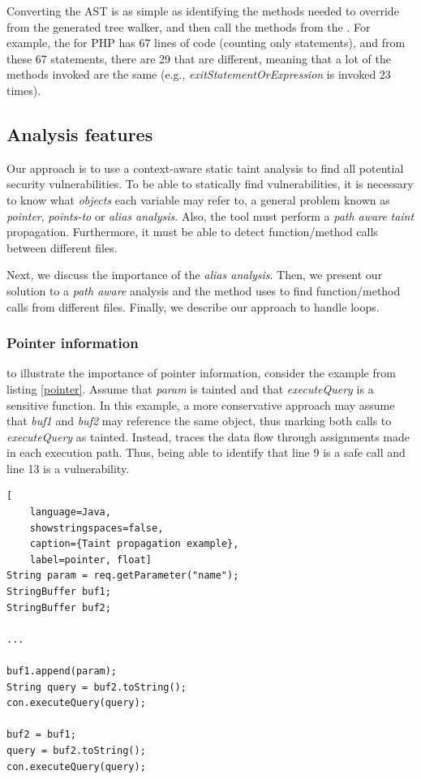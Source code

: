 Converting the AST is as simple as identifying the methods needed to override from the generated tree walker, and then call the methods from the \astbuilder{}.
For example, the \converter{} for PHP has 67 lines of code (counting only statements), and from these 67 statements, there are 29 that are different, meaning that a lot of the methods invoked are the same (e.g., \textit{exitStatementOrExpression} is invoked 23 times). 


\subsection{Analysis features}

Our approach is to use a context-aware static taint analysis to find all potential security vulnerabilities. To be able to statically find vulnerabilities, it is necessary to know what \textit{objects} each variable may refer to, a general problem known as \textit{pointer}, \textit{points-to} or \textit{alias analysis}\cite{sridharan2013alias}. Also, the tool must perform a \textit{path aware} \textit{taint} propagation. Furthermore, it must be able to detect function/method calls between different files.

Next, we discuss the importance of the \textit{alias analysis}. Then, we present our solution to a \textit{path aware} analysis and the method \toolname{} uses to find function/method calls from different files. Finally, we describe our approach to handle loops.

\subsubsection{Pointer information} to illustrate the importance of pointer information, consider the example from listing \ref{pointer}. Assume that \textit{param} is tainted and that \textit{executeQuery} is a sensitive function. In this example, a more conservative approach may assume that \textit{buf1} and \textit{buf2} may reference the same object, thus marking both calls to \textit{executeQuery} as tainted. Instead, \toolname{} traces the data flow through assignments made in each execution path. Thus, being able to identify that line 9 is a safe call and line 13 is a vulnerability.


\begin{lstlisting}[
    language=Java,
    showstringspaces=false,
    caption={Taint propagation example},
    label=pointer, float] 
String param = req.getParameter("name");
StringBuffer buf1;
StringBuffer buf2;

...

buf1.append(param);
String query = buf2.toString();
con.executeQuery(query);

buf2 = buf1;
query = buf2.toString();
con.executeQuery(query);
\end{lstlisting}


